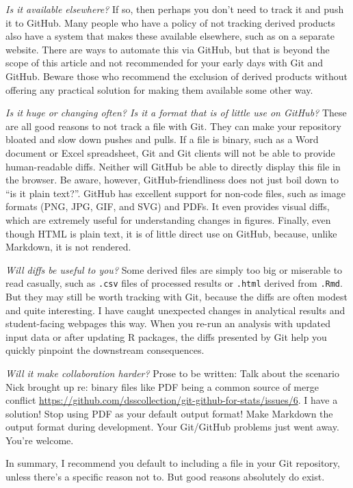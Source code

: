 \documentclass[12pt]{article}
\begin{document}
\emph{Is it available elsewhere?} If so, then perhaps you don't need to
track it and push it to GitHub. Many people who have a policy of not
tracking derived products also have a system that makes these available
elsewhere, such as on a separate website. There are ways to automate
this via GitHub, but that is beyond the scope of this article and not
recommended for your early days with Git and GitHub. Beware those who
recommend the exclusion of derived products without offering any
practical solution for making them available some other way.

\emph{Is it huge or changing often? Is it a format that is of little use
on GitHub?} These are all good reasons to not track a file with Git.
They can make your repository bloated and slow down pushes and pulls. If
a file is binary, such as a Word document or Excel spreadsheet, Git and
Git clients will not be able to provide human-readable diffs. Neither
will GitHub be able to directly display this file in the browser. Be
aware, however, GitHub-friendliness does not just boil down to ``is it
plain text?''. GitHub has excellent support for non-code files, such as
image formats (PNG, JPG, GIF, and SVG) and PDFs. It even provides visual
diffs, which are extremely useful for understanding changes in figures.
Finally, even though HTML is plain text, it is of little direct use on
GitHub, because, unlike Markdown, it is not rendered.

\emph{Will diffs be useful to you?} Some derived files are simply too
big or miserable to read casually, such as \texttt{.csv} files of
processed results or \texttt{.html} derived from \texttt{.Rmd}. But they
may still be worth tracking with Git, because the diffs are often modest
and quite interesting. I have caught unexpected changes in analytical
results and student-facing webpages this way. When you re-run an
analysis with updated input data or after updating R packages, the diffs
presented by Git help you quickly pinpoint the downstream consequences.

\emph{Will it make collaboration harder?} Prose to be written: Talk
about the scenario Nick brought up re: binary files like PDF being a
common source of merge conflict
\url{https://github.com/dsscollection/git-github-for-stats/issues/6}. I
have a solution! Stop using PDF as your default output format! Make
Markdown the output format during development. Your Git/GitHub problems
just went away. You're welcome.

In summary, I recommend you default to including a file in your Git
repository, unless there's a specific reason not to. But good reasons
absolutely do exist.
\end{document}

